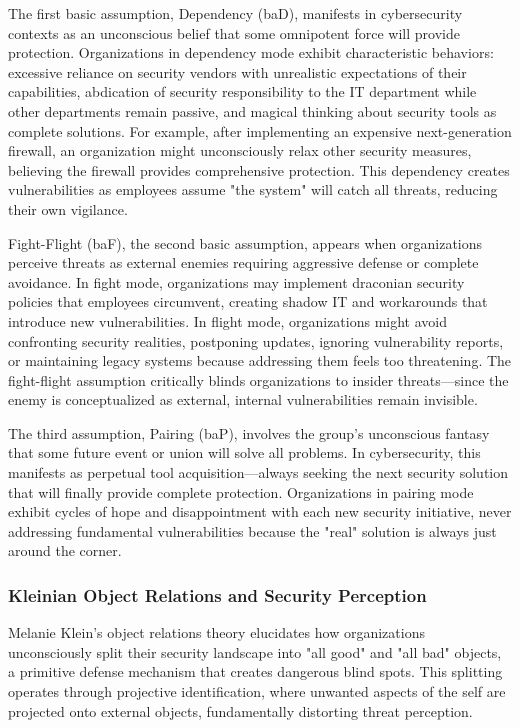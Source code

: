 \documentclass[11pt,a4paper]{article}
\begin{document}
The first basic assumption, Dependency (baD), manifests in cybersecurity contexts as an unconscious belief that some omnipotent force will provide protection. Organizations in dependency mode exhibit characteristic behaviors: excessive reliance on security vendors with unrealistic expectations of their capabilities, abdication of security responsibility to the IT department while other departments remain passive, and magical thinking about security tools as complete solutions. For example, after implementing an expensive next-generation firewall, an organization might unconsciously relax other security measures, believing the firewall provides comprehensive protection. This dependency creates vulnerabilities as employees assume "the system" will catch all threats, reducing their own vigilance.

Fight-Flight (baF), the second basic assumption, appears when organizations perceive threats as external enemies requiring aggressive defense or complete avoidance. In fight mode, organizations may implement draconian security policies that employees circumvent, creating shadow IT and workarounds that introduce new vulnerabilities. In flight mode, organizations might avoid confronting security realities, postponing updates, ignoring vulnerability reports, or maintaining legacy systems because addressing them feels too threatening. The fight-flight assumption critically blinds organizations to insider threats—since the enemy is conceptualized as external, internal vulnerabilities remain invisible.

The third assumption, Pairing (baP), involves the group's unconscious fantasy that some future event or union will solve all problems. In cybersecurity, this manifests as perpetual tool acquisition—always seeking the next security solution that will finally provide complete protection. Organizations in pairing mode exhibit cycles of hope and disappointment with each new security initiative, never addressing fundamental vulnerabilities because the "real" solution is always just around the corner.

\subsubsection{Kleinian Object Relations and Security Perception}

Melanie Klein's object relations theory\cite{klein1946} elucidates how organizations unconsciously split their security landscape into "all good" and "all bad" objects, a primitive defense mechanism that creates dangerous blind spots. This splitting operates through projective identification, where unwanted aspects of the self are projected onto external objects, fundamentally distorting threat perception.
\end{document}
